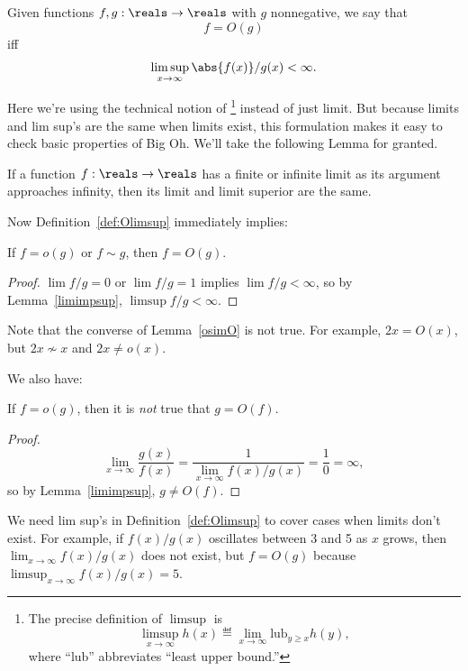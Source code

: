 \begin{definition}\label{def:Olimsup}
Given functions $f, g : \reals \to \reals$ with $g$ nonnegative, we
say that
\[
f = O(g)
\]
iff
\[
\limsup_{x \rightarrow \infty} \abs{f(x)}/g(x) < \infty.
\]
\end{definition}
Here we're using the technical notion of \footnote{The precise definition of $\limsup$ is
\[
\limsup_{x \rightarrow \infty} h(x) \eqdef \lim_{x \rightarrow \infty}
\text{lub}_{y \geq x} h(y),
\]
where ``lub'' abbreviates ``least upper bound.''} instead of just
limit.  But because limits and lim sup's are the same when limits
exist, this formulation makes it easy to check basic properties of Big
Oh.  We'll take the following Lemma for granted.
\begin{lemma}\label{limimpsup}
If a function $f: \reals \to \reals$ has a finite or infinite limit as
its argument approaches infinity, then its limit and limit superior
are the same.

\end{lemma}
  
Now Definition~\ref{def:Olimsup} immediately implies:
\begin{lemma}\label{osimO}
If $f = o(g)$ or $f \sim g$, then $f = O(g)$.
\end{lemma}

\begin{proof}
$\lim f/g=0$ or $\lim f/g=1$ implies $\lim f/g<\infty$, so by
  Lemma~\ref{limimpsup}, $\limsup f/g<\infty$.
\end{proof}
Note that the converse of Lemma~\ref{osimO} is not true.  For example,
$2x = O(x)$, but $2x \not\sim x$ and $2x \neq o(x)$.

We also have:
\begin{lemma}
If $f = o(g)$, then it is \emph{not} true that $g = O(f)$.
\end{lemma}

\begin{proof}
\[
\lim_{x \rightarrow \infty} \frac{g(x)}{f(x)} =
 \frac{1}{\lim_{x \rightarrow \infty} f(x)/g(x)} =
 \frac{1}{0} = \infty,
\]
so by Lemma~\ref{limimpsup}, %
$g \neq O(f)$.
\end{proof}

We need lim sup's in Definition~\ref{def:Olimsup} to cover cases when
limits don't exist.  For example, if $f(x)/g(x)$ oscillates between 3
and 5 as $x$ grows, then $\lim_{x \rightarrow \infty} f(x)/g(x)$ does
not exist, but $f = O(g)$ because $\limsup_{x \rightarrow \infty}
f(x)/g(x) = 5$.

